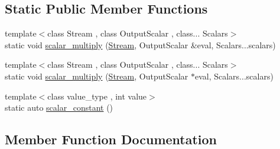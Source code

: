 \subsection*{Static Public Member Functions}
\begin{DoxyCompactItemize}
\item 
{\footnotesize template$<$class Stream , class Output\+Scalar , class... Scalars$>$ }\\static void \hyperlink{structBC_1_1tensors_1_1exprs_1_1blas__tools_1_1BLAS__Tools_3_01host__tag_01_4_aedaf522df616b17b9bc66b708b122f57}{scalar\+\_\+multiply} (\hyperlink{namespaceBC_abc64a63cd29a22d102a68f478dfd588d}{Stream}, Output\+Scalar \&eval, Scalars...\+scalars)
\item 
{\footnotesize template$<$class Stream , class Output\+Scalar , class... Scalars$>$ }\\static void \hyperlink{structBC_1_1tensors_1_1exprs_1_1blas__tools_1_1BLAS__Tools_3_01host__tag_01_4_a7a2926bf7415f4383cb8ddecc0b2458e}{scalar\+\_\+multiply} (\hyperlink{namespaceBC_abc64a63cd29a22d102a68f478dfd588d}{Stream}, Output\+Scalar $\ast$eval, Scalars...\+scalars)
\item 
{\footnotesize template$<$class value\+\_\+type , int value$>$ }\\static auto \hyperlink{structBC_1_1tensors_1_1exprs_1_1blas__tools_1_1BLAS__Tools_3_01host__tag_01_4_ab55487639c6d0c2e8fa42ee9a87e3ac6}{scalar\+\_\+constant} ()
\end{DoxyCompactItemize}


\subsection{Member Function Documentation}

